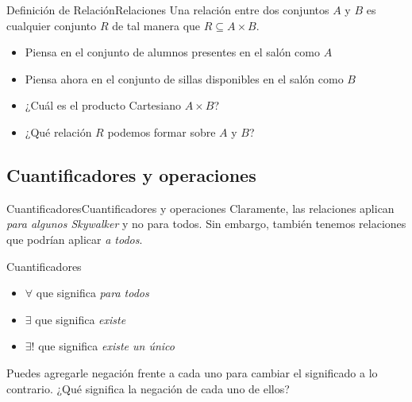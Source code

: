 \documentclass[spanish, c]{beamer}
\begin{document}
\begin{frame}{Definición de Relación}{Relaciones}
    Una \alert{relación} entre dos conjuntos $A$ y $B$ es cualquier conjunto $R$ de tal manera que $R \subseteq A \times B$. \pause

    \bigskip

    \begin{itemize}
        \item Piensa en el conjunto de alumnos presentes en el salón como $A$ \pause
        \item Piensa ahora en el conjunto de sillas disponibles en el salón como $B$ \pause
        \item ¿Cuál es el producto Cartesiano $A \times B$? \pause
        \item ¿Qué relación $R$ podemos formar sobre $A$ y $B$?
    \end{itemize} \pause

\end{frame}

\subsection{Cuantificadores y operaciones}

\begin{frame}{Cuantificadores}{Cuantificadores y operaciones}
    Claramente, las relaciones aplican \textit{para algunos Skywalker} y no para todos. \pause
    Sin embargo, también tenemos relaciones que podrían aplicar \textit{a todos}. \pause

    \begin{block}{Cuantificadores}
        \begin{itemize}
            \item $\forall$ que significa \textit{para todos}
            \item $\exists$ que significa \textit{existe}
            \item $\exists!$ que significa \textit{existe un único}
        \end{itemize}
    \end{block} \pause

    \bigskip

    Puedes agregarle negación frente a cada uno para cambiar el significado a lo contrario.
    ¿Qué significa la negación de cada uno de ellos?
\end{frame}
\end{document}
